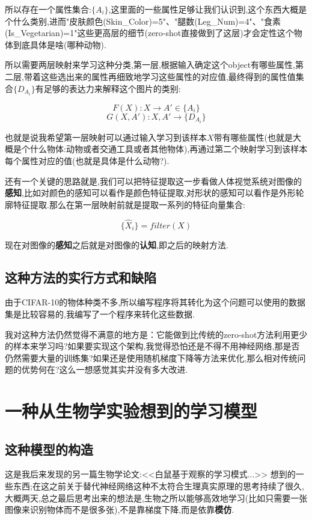 所以存在一个属性集合:$\{A_i\}$,这里面的一些属性足够让我们认识到,这个东西大概是个什么类别,进而"皮肤颜色(Skin_Color)=5"、"腿数(Leg_Num)=4"、"食素(Is_Vegetarian)=1"这些更高层的细节(zero-shot直接做到了这层)才会定性这个物体到底具体是啥(哪种动物).

所以需要两层映射来学习这种分类,第一层,根据输入确定这个object有哪些属性,第二层,带着这些选出来的属性再细致地学习这些属性的对应值,最终得到的属性值集合$\{D_{A_i}\}$有足够的表达力来解释这个图片的类别:

$$F(X):X \rightarrow A' \in \{A_i\}$$
$$G(X,A'): X,A' \rightarrow \{D_{A_i}\}$$

也就是说我希望第一层映射可以通过输入学习到该样本$X$带有哪些属性(也就是大概是个什么物体:动物或者交通工具或者其他物体),再通过第二个映射学习到该样本每个属性对应的值(也就是具体是什么动物?).

还有一个关键的思路就是,我们可以把特征提取这一步看做人体视觉系统对图像的\textbf{感知},比如对颜色的感知可以看作是颜色特征提取\cite{A5},对形状的感知可以看作是外形轮廓特征提取\cite{A6}.那么在第一层映射前就是提取一系列的特征向量集合:

$$\{\hat{X}_i\} = filter(X)$$

现在对图像的\textbf{感知}之后就是对图像的\textbf{认知},即之后的映射方法.

\subsection{这种方法的实行方式和缺陷}
由于CIFAR-10的物体种类不多,所以编写程序将其转化为这个问题可以使用的数据集是比较容易的,我编写了一个程序来转化这些数据.

我对这种方法仍然觉得不满意的地方是：它能做到比传统的zero-shot方法利用更少的样本来学习吗?如果要实现这个架构,我觉得恐怕还是不得不用神经网络,那是否仍然需要大量的训练集?如果还是使用随机梯度下降等方法来优化,那么相对传统问题的优势何在?这么一想感觉其实并没有多大改进.




\section{一种从生物学实验想到的学习模型}
\subsection{这种模型的构造}
这是我后来发现的另一篇生物学论文:<<白鼠基于观察的学习模式...>> \cite{A3}想到的一些东西;在这之前关于替代神经网络这种不太符合生理真实原理的思考持续了很久,大概两天,总之最后思考出来的想法是,生物之所以能够高效地学习(比如只需要一张图像来识别物体而不是很多张),不是靠梯度下降,而是依靠\textbf{模仿}.

